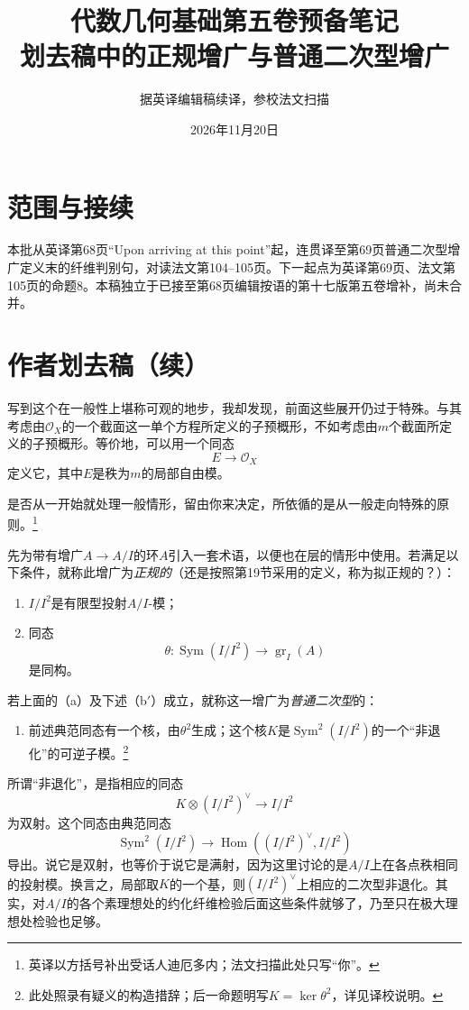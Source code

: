 \documentclass[openany,fontset=fandol]{ctexbook}
\begin{document}
\title{代数几何基础第五卷预备笔记\\划去稿中的正规增广与普通二次型增广}
\author{据英译编辑稿续译，参校法文扫描}
\date{2026年11月20日}
\maketitle
\chapter*{范围与接续}
本批从英译第68页“Upon arriving at this point”起，连贯译至第69页普通二次型增广定义末的纤维判别句，对读法文第104--105页。下一起点为英译第69页、法文第105页的命题8。本稿独立于已接至第68页编辑按语的第十七版第五卷增补，尚未合并。
\chapter*{作者划去稿（续）}
写到这个在一般性上堪称可观的地步，我却发现，前面这些展开仍过于特殊。与其考虑由$\mathcal O_X$的一个截面这一单个方程所定义的子预概形，不如考虑由$m$个截面所定义的子预概形。等价地，可以用一个同态
\[
E\longrightarrow\mathcal O_X
\]
定义它，其中$E$是秩为$m$的局部自由模。

是否从一开始就处理一般情形，留由你来决定，所依循的是从一般走向特殊的原则。\footnote{英译以方括号补出受话人迪厄多内；法文扫描此处只写“你”。}

先为带有增广$A\to A/I$的环$A$引入一套术语，以便也在层的情形中使用。若满足以下条件，就称此增广为\emph{正规的}（还是按照第19节采用的定义，称为拟正规的？）：
\begin{enumerate}
\item[(a)] $I/I^2$是有限型投射$A/I$-模；
\item[(b)] 同态
\[
\theta:\operatorname{Sym}(I/I^2)\longrightarrow\operatorname{gr}_I(A)
\]
是同构。
\end{enumerate}

若上面的（a）及下述（b$'$）成立，就称这一增广为\emph{普通二次型}的：
\begin{enumerate}
\item[(b$'$)] 前述典范同态有一个核，由$\theta^2$生成；这个核$K$是$\operatorname{Sym}^2(I/I^2)$的一个“非退化”的可逆子模。\footnote{此处照录有疑义的构造措辞；后一命题明写$K=\ker\theta^2$，详见译校说明。}
\end{enumerate}
所谓“非退化”，是指相应的同态
\[
K\otimes (I/I^2)^\vee\longrightarrow I/I^2
\]
为双射。这个同态由典范同态
\[
\operatorname{Sym}^2(I/I^2)\longrightarrow
\operatorname{Hom}((I/I^2)^\vee,I/I^2)
\]
导出。说它是双射，也等价于说它是满射，因为这里讨论的是$A/I$上在各点秩相同的投射模。换言之，局部取$K$的一个基，则$(I/I^2)^\vee$上相应的二次型非退化。其实，对$A/I$的各个素理想处的约化纤维检验后面这些条件就够了，乃至只在极大理想处检验也足够。
\end{document}
